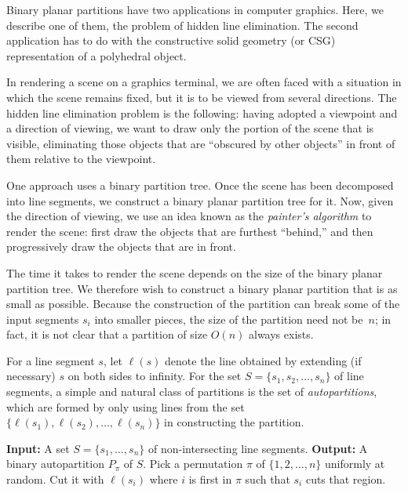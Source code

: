 \documentclass[twoside,12pt]{book}
\theoremstyle{plain}
\theoremstyle{definition}
\theoremstyle{remark}
\begin{document}
Binary planar partitions have two applications in computer graphics.  Here,
we describe one of them, the problem of hidden line elimination.  The second
application has to do with the constructive solid geometry (or CSG)
representation of a polyhedral object.

In rendering a scene on a graphics terminal, we are often faced with a
situation in which the scene remains fixed, but it is to be viewed from
several directions.  The hidden line elimination problem is the following:
having adopted a viewpoint and a direction of viewing, we want to draw only
the portion of the scene that is visible, eliminating those objects that are
``obscured by other objects'' in front of them relative to the viewpoint.

One approach uses a binary partition tree.  Once the scene has been decomposed
into line segments, we construct a binary planar partition tree for it.  Now,
given the direction of viewing, we use an idea known as the \emph{painter's
algorithm} to render the scene: first draw the objects that are furthest
``behind,'' and then progressively draw the objects that are in front.

The time it takes to render the scene depends on the size of the binary
planar partition tree.  We therefore wish to construct a binary planar
partition that is as small as possible.  Because the construction of the
partition can break some of the input segments $s_i$ into smaller pieces, the
size of the partition need not be~$n$; in fact, it is not clear that a
partition of size $O(n)$ always exists.

For a line segment $s$, let $\ell(s)$ denote the line obtained by extending
(if necessary) $s$ on both sides to infinity.  For the set
$S=\{s_1,s_2,\ldots,s_n\}$ of line segments, a simple and natural class of
partitions is the set of \emph{autopartitions}, which are formed by only
using lines from the set $\{\ell(s_1),\ell(s_2),\ldots,\ell(s_n)\}$ in
constructing the partition.

\begin{algorithm}[htbp]
\caption{RandAuto}
\label{alg:randauto}
\begin{algorithmic}[1]
\State \textbf{Input:} A set $S=\{s_1,\ldots,s_n\}$ of non-intersecting
  line segments.
\State \textbf{Output:} A binary autopartition $P_\pi$ of $S$.
\State Pick a permutation $\pi$ of $\{1,2,\ldots,n\}$ uniformly at random.
  \State Cut it with $\ell(s_i)$ where $i$ is first in $\pi$ such that
    $s_i$ cuts that region.
\EndWhile
\end{algorithmic}
\end{algorithm}
\end{document}
